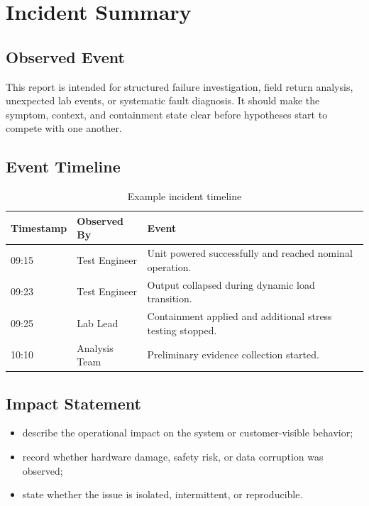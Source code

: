\section{Incident Summary}

\subsection{Observed Event}
This report is intended for structured failure investigation, field return
analysis, unexpected lab events, or systematic fault diagnosis. It should make
the symptom, context, and containment state clear before hypotheses start to
compete with one another.


\subsection{Event Timeline}
\begin{table}[H]
    \centering
    \small
    \begin{tabular}{p{2.4cm} p{3.0cm} p{5.5cm}}
        \toprule
        \textbf{Timestamp} & \textbf{Observed By} & \textbf{Event} \\
        \midrule
        09:15 & Test Engineer & Unit powered successfully and reached nominal operation. \\
        09:23 & Test Engineer & Output collapsed during dynamic load transition. \\
        09:25 & Lab Lead & Containment applied and additional stress testing stopped. \\
        10:10 & Analysis Team & Preliminary evidence collection started. \\
        \bottomrule
    \end{tabular}
    \caption{Example incident timeline}
    \label{tab:incident-timeline}
\end{table}

\subsection{Impact Statement}
\begin{itemize}
    \item describe the operational impact on the system or customer-visible behavior;
    \item record whether hardware damage, safety risk, or data corruption was observed;
    \item state whether the issue is isolated, intermittent, or reproducible.
\end{itemize}

